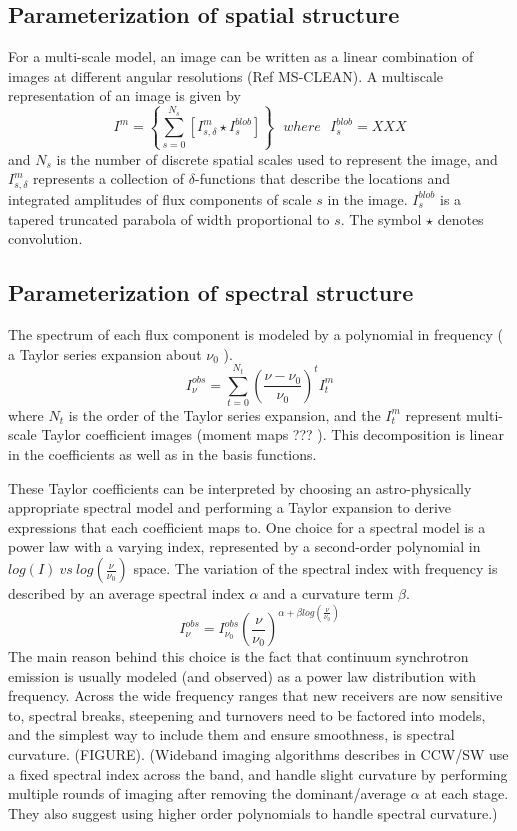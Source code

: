 \documentclass[structabstract]{aa}
\newcommand{\nuno}{{\left(\frac{\nu}{\nu_0}\right)}}
\newcommand{\dnuno}{{\left(\frac{\nu-\nu_0}{\nu_0}\right)}}
\begin{document}
\subsection{Parameterization of spatial structure}
For a multi-scale model, an image can be written as a linear combination of images
at different angular resolutions (Ref MS-CLEAN).
A multiscale representation of an image is given by 
\begin{equation}
I^m = \left\{ \sum_{s=0}^{N_s} \left[ I^m_{s,\delta}\star I^{blob}_s \right] \right\}
~~~ where ~~~ I^{blob}_s = XXX
\label{EQN_MS}
\end{equation}
and $N_s$ is the number of discrete spatial scales used to represent the image, and
$I^m_{s,\delta}$ represents a collection of $\delta$-functions that describe the locations
and integrated amplitudes of flux components of scale $s$ in the image.
$I^{blob}_s$ is a tapered truncated parabola of width proportional to $s$.
The symbol $\star$ denotes convolution.

\subsection{Parameterization of spectral structure}
The spectrum of each flux component is modeled by a polynomial in frequency
( a Taylor series expansion about $\nu_0$ ).
\begin{equation}
I^{obs}_{\nu} = \sum_{t=0}^{N_t} \dnuno^t I^m_t 
\label{EQN_TS}
\end{equation}
where $N_t$ is the order of the Taylor series expansion, and 
the $I^m_t$ represent multi-scale Taylor coefficient images (moment maps ??? ).
This decomposition is linear in the coefficients as well as in the basis functions.

These Taylor coefficients can be interpreted by choosing an astro-physically appropriate
spectral model and performing a Taylor expansion to derive expressions that each coefficient
maps to.
One choice for a spectral model is a power law with a varying index, represented by a 
second-order polynomial in $log(I)~vs~log\nuno$ space.
The variation of the spectral index with frequency is described by an average spectral
index $\alpha$ and a curvature term $\beta$.
\begin{equation}
I_{\nu}^{obs} = I_{\nu_0}^{obs} \nuno^{\alpha + \beta log \nuno}
\label{EQN_POWERLAW1}
\end{equation}
The main reason behind this choice is the fact that continuum synchrotron emission is 
usually modeled (and observed) as a power law distribution with frequency. Across the wide
frequency ranges that new receivers are now sensitive to, 
spectral breaks, steepening and turnovers need to be factored into
models, and the simplest way to include them and ensure smoothness, is spectral curvature.
(FIGURE).
(Wideband imaging algorithms describes in CCW/SW use a fixed spectral index across the band,
and handle slight curvature by performing multiple rounds of imaging after removing the 
dominant/average $\alpha$ at each stage. 
They also suggest using higher order polynomials to handle spectral curvature.)
\end{document}
